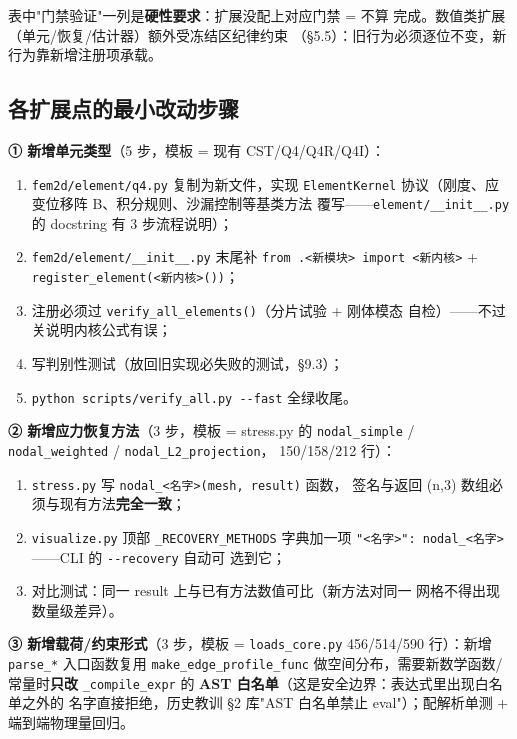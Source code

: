 \documentclass[12pt,a4paper]{ctexart}
\newcommand{\fem}{\Verb}
\begin{document}
表中"门禁验证"一列是\textbf{硬性要求}：扩展没配上对应门禁 = 不算
完成。数值类扩展（单元/恢复/估计器）额外受冻结区纪律约束
（§5.5）：旧行为必须逐位不变，新行为靠新增注册项承载。

\subsection{各扩展点的最小改动步骤}

\textbf{① 新增单元类型}（5 步，模板 = 现有 CST/Q4/Q4R/Q4I）：
\begin{enumerate}[leftmargin=*]
  \item \fem|fem2d/element/q4.py| 复制为新文件，实现 \fem|ElementKernel|
        协议（刚度、应变位移阵 B、积分规则、沙漏控制等基类方法
        覆写——\fem|element/__init__.py| 的 docstring 有 3 步流程说明）；
  \item \fem|fem2d/element/__init__.py| 末尾补
        \fem|from .<新模块> import <新内核>| + \fem|register_element(<新内核>())|；
  \item 注册必须过 \fem|verify_all_elements()|（分片试验 + 刚体模态
        自检）——不过关说明内核公式有误；
  \item 写判别性测试（放回旧实现必失败的测试，§9.3）；
  \item \fem|python scripts/verify_all.py --fast| 全绿收尾。
\end{enumerate}

\textbf{② 新增应力恢复方法}（3 步，模板 = stress.py 的
\fem|nodal_simple| / \fem|nodal_weighted| / \fem|nodal_L2_projection|，
150/158/212 行）：
\begin{enumerate}[leftmargin=*]
  \item \fem|stress.py| 写 \fem|nodal_<名字>(mesh, result)| 函数，
        签名与返回 (n,3) 数组必须与现有方法\textbf{完全一致}；
  \item \fem|visualize.py| 顶部 \fem|_RECOVERY_METHODS| 字典加一项
        \fem|"<名字>": nodal_<名字>|——CLI 的 \fem|--recovery| 自动可
        选到它；
  \item 对比测试：同一 result 上与已有方法数值可比（新方法对同一
        网格不得出现数量级差异）。
\end{enumerate}

\textbf{③ 新增载荷/约束形式}（3 步，模板 = \fem|loads_core.py|
456/514/590 行）：新增 \fem|parse_*| 入口函数复用 \fem|make_edge_profile_func|
做空间分布，需要新数学函数/常量时\textbf{只改} \fem|_compile_expr|
的 \textbf{AST 白名单}（这是安全边界：表达式里出现白名单之外的
名字直接拒绝，历史教训 §2 库"AST 白名单禁止 eval"）；配解析单测 +
端到端物理量回归。
\end{document}
